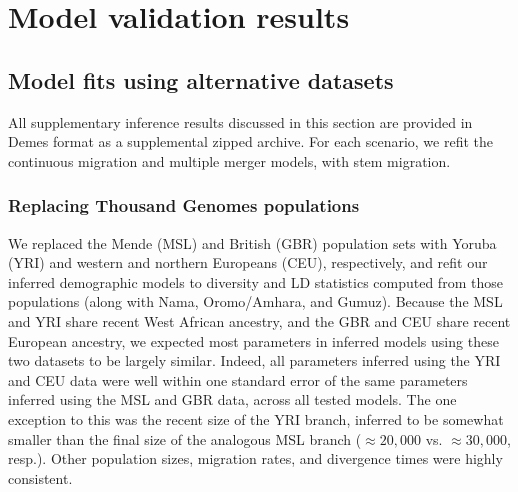\documentclass[]{article}
\begin{document}
\section{Model validation results}\label{sec:supp-results}
\label{sec:validation_results}
\subsection{Model fits using alternative datasets}
\label{sec:supp-alt-data}

All supplementary inference results discussed in this section are provided in
Demes format \citep{Gower2022-yn} as a supplemental zipped archive. For each
scenario, we refit the continuous migration and multiple merger models, with
stem migration.

\subsubsection{Replacing Thousand Genomes populations}
\label{sec:replacing}
We replaced the Mende (MSL) and British (GBR) population sets with Yoruba (YRI)
and western and northern Europeans (CEU), respectively, and refit our inferred
demographic models to diversity and LD statistics computed from those
populations (along with Nama, Oromo/Amhara, and Gumuz). Because the MSL and YRI
share recent West African ancestry, and the GBR and CEU share recent European
ancestry, we expected most parameters in inferred models using these two
datasets to be largely similar. Indeed, all parameters inferred using the YRI
and CEU data were well within one standard error of the same parameters
inferred using the MSL and GBR data, across all tested models. The one
exception to this was the recent size of the YRI branch, inferred to be
somewhat smaller than the final size of the analogous MSL branch ($\approx
20,000$ vs. $\approx 30,000$, resp.). Other population sizes, migration rates,
and divergence times were highly consistent.
\end{document}
